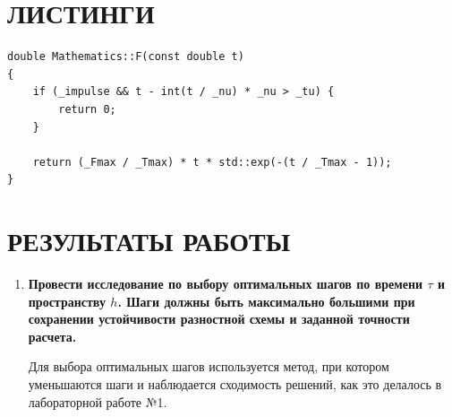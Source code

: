 \section{ЛИСТИНГИ}

\begin{lstlisting}[caption=Функция потока тепла]
double Mathematics::F(const double t)
{
    if (_impulse && t - int(t / _nu) * _nu > _tu) {
        return 0;
    }

    return (_Fmax / _Tmax) * t * std::exp(-(t / _Tmax - 1));
}
\end{lstlisting}

\section{РЕЗУЛЬТАТЫ РАБОТЫ}

\begin{enumerate}
    \item \textbf{Провести исследование по выбору оптимальных шагов по времени $\tau$ и пространству $h$. Шаги должны быть максимально большими при сохранении устойчивости разностной схемы и заданной точности расчета.}

        Для выбора оптимальных шагов используется метод, при котором уменьшаются шаги и наблюдается сходимость решений, как это делалось в лабораторной работе №1.


\end{enumerate}
